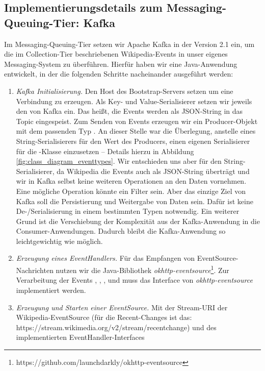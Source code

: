 \subsection{Implementierungsdetails zum Messaging-Queuing-Tier: Kafka}
Im Messaging-Queuing-Tier setzen wir Apache Kafka in der Version 2.1 ein, um die im Collection-Tier beschriebenen Wikipedia-Events
in unser eigenes Messaging-System zu überführen. Hierfür haben wir eine Java-Anwendung entwickelt, in der die folgenden
Schritte nacheinander ausgeführt werden:
\begin{enumerate}
    \item \textit{Kafka Initialisierung.} Den Host des Bootstrap-Servers setzen um eine Verbindung zu erzeugen.
    Als Key- und Value-Serialisierer setzen wir
    jeweils den  von Kafka ein. Das heißt, die Events werden als JSON-String in das Topic 
    eingespeist. Zum Senden von Events erzeugen wir ein Producer-Objekt mit dem passenden Typ .
    An dieser Stelle war die Überlegung, anstelle eines String-Serialisierers für den Wert des Producers,
    einen eigenen Serialisierer für die -Klasse einzusetzen -- Details hierzu in Abbildung \ref{fig:class_diagram_eventtypes}. Wir entschieden uns aber für den
    String-Serialisierer, da Wikipedia die Events auch als JSON-String überträgt und wir in Kafka selbst
    keine weiteren Operationen an den Daten vornehmen. Eine mögliche Operation könnte ein Filter sein.
    Aber das einzige Ziel von Kafka soll die Persistierung und Weitergabe von Daten sein. Dafür ist keine De-/Serialisierung in
    einem bestimmten Typen notwendig. Ein weiterer Grund ist die Verschiebung der Komplexität aus der Kafka-Anwendung
    in die Consumer-Anwendungen. Dadurch bleibt die Kafka-Anwendung so leichtgewichtig wie möglich.
    \item \textit{Erzeugung eines EventHandlers.} Für das Empfangen von EventSource-Nachrichten nutzen wir die Java-Bibliothek
    \textit{okhttp-eventsource}\footnote{https://github.com/launchdarkly/okhttp-eventsource}. Zur Verarbeitung der Events
    , , ,  und  muss das Interface  von
    \textit{okhttp-eventsource} implementiert werden.
    \item \textit{Erzeugung und Starten einer EventSource.} Mit der Stream-URI der Wikipedia-EventSource (für die Recent-Changes ist das: https://stream.wikimedia.org/v2/stream/recentchange)
    und des implementierten EventHandler-Interfaces

\end{enumerate}
